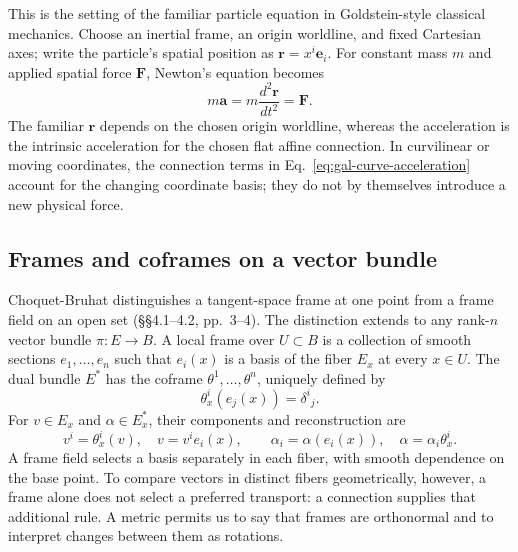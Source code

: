 This is the setting of the familiar particle equation in Goldstein-style
classical mechanics.  Choose an inertial frame, an origin worldline, and
fixed Cartesian axes; write the particle's spatial position as
$\mathbf r=x^i\mathbf e_i$.  For constant mass $m$ and applied spatial force
$\mathbf F$, Newton's equation becomes
\begin{equation}\label{eq:gal-newton-goldstein}
 m\mathbf a=m\frac{d^2\mathbf r}{dt^2}=\mathbf F.
\end{equation}
The familiar $\mathbf r$ depends on the chosen origin worldline, whereas
the acceleration is the intrinsic acceleration for the chosen flat affine
connection.  In curvilinear or moving coordinates, the connection terms in
Eq.~\eqref{eq:gal-curve-acceleration} account for the changing coordinate
basis; they do not by themselves introduce a new physical force.

\subsection{Frames and coframes on a vector bundle}

Choquet-Bruhat distinguishes a tangent-space frame at one point from a
frame field on an open set (\S\S4.1--4.2, pp.~3--4).
The distinction extends to any rank-$n$ vector bundle $\pi:E\to B$.
A local frame over $U\subset B$ is a collection of smooth sections
$e_1,\ldots,e_n$ such that $e_i(x)$ is a basis of the fiber $E_x$ at
every $x\in U$.  The dual bundle $E^*$ has the coframe
$\theta^1,\ldots,\theta^n$, uniquely defined by
\begin{equation}\label{eq:gal-dual-frame}
 \theta^i_x(e_j(x))=\delta^i{}_j.
\end{equation}
For $v\in E_x$ and $\alpha\in E_x^*$, their components and reconstruction
are
\begin{equation}\label{eq:gal-frame-reconstruction}
 v^i=\theta^i_x(v),\quad v=v^i e_i(x),\qquad
 \alpha_i=\alpha(e_i(x)),\quad \alpha=\alpha_i\theta^i_x.
\end{equation}
A frame field selects a basis separately in each fiber, with smooth dependence
on the base point.  To compare vectors in distinct fibers geometrically,
however, a frame alone does not select a preferred transport: a connection
supplies that additional rule.  A metric permits us to say that frames are
orthonormal and to interpret changes between them as rotations.

